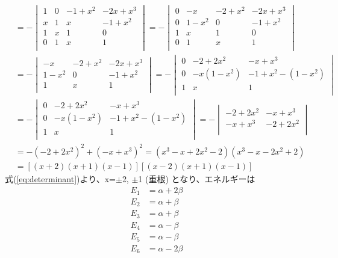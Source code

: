 \documentclass[11pt,pra,aps]{revtex4}
\begin{document}
\begin{align}
  &=-
  \begin{vmatrix}
    1 & 0 & -1+x^2 & -2x+x^3 \\
    x & 1 & x & -1+x^2 \\
    1 & x & 1 & 0 \\
    0 & 1 & x & 1 \\
  \end{vmatrix}
  =-
  \begin{vmatrix}
    0 & -x & -2+x^2 & -2x+x^3 \\
    0 & 1-x^2 & 0 & -1+x^2 \\
    1 & x & 1 & 0 \\
    0 & 1 & x & 1 \\
  \end{vmatrix} \nonumber \\
  &=-
  \begin{vmatrix}
    -x & -2+x^2 & -2x+x^3 \\
    1-x^2 & 0 & -1+x^2 \\
    1 & x & 1 \\
  \end{vmatrix}
  =-
  \begin{vmatrix}
    0 & -2+2x^2 & -x+x^3 \\
    0 & -x(1-x^2) & -1+x^2-(1-x^2) \\
    1 & x & 1 \\
  \end{vmatrix} \nonumber \\
  &=-
  \begin{vmatrix}
    0 & -2+2x^2 & -x+x^3 \\
    0 & -x(1-x^2) & -1+x^2-(1-x^2) \\
    1 & x & 1 \\
  \end{vmatrix}
  =-
  \begin{vmatrix}
    -2+2x^2 & -x+x^3 \\
    -x+x^3 & -2+2x^2 \\
  \end{vmatrix} \nonumber \\
  &=-(-2+2x^2)^2+(-x+x^3)^2=(x^3-x+2x^2-2)(x^3-x-2x^2+2) \nonumber \\
  &=\left[(x+2)(x+1)(x-1)\right]\left[(x-2)(x+1)(x-1)\right] \label{eq:determinant}
\end{align}
式(\ref{eq:determinant})より、x=$\pm$2, $\pm$1 (重根) となり、エネルギーは
\begin{align}
E_1&=\alpha+2\beta\\
E_2&=\alpha+ \beta\\
E_3&=\alpha+ \beta\\
E_4&=\alpha- \beta\\
E_5&=\alpha- \beta\\  
E_6&=\alpha-2\beta
\end{align}
\end{document}
